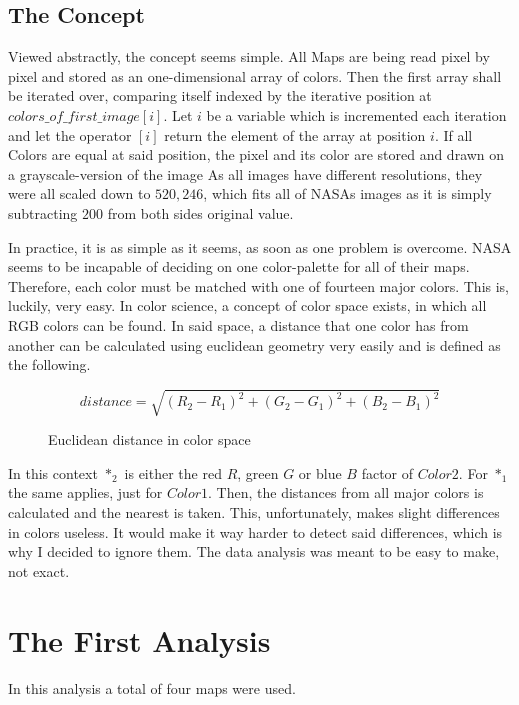 \documentclass{article}
\begin{document}
\begin{multicols}{3}
\section{The Concept}

Viewed abstractly, the concept seems simple.
All Maps are being read pixel by pixel and stored as an one-dimensional array of colors.
Then the first array shall be iterated over, comparing itself indexed by the iterative position at \(colors\_of\_first\_image[i]\).
Let \(i\) be a variable which is incremented each iteration and let the operator \([i]\) return the element of the array at position \(i\).
If all Colors are equal at said position, the pixel and its color are stored and drawn on a grayscale-version of the image
As all images have different resolutions, they were all scaled down to \(520,246\), which fits all of NASAs images as it is simply subtracting \(200\) from both sides original value.

In practice, it is as simple as it seems, as soon as one problem is overcome.
NASA seems to be incapable of deciding on one color-palette for all of their maps.
Therefore, each color must be matched with one of fourteen major colors.
This is, luckily, very easy.
In color science, a concept of color space exists, in which all RGB colors can be found.
In said space, a distance that one color has from another can be calculated using euclidean geometry very easily and is defined as the following.

\end{multicols}
    \begin{figure}[H]
        \[distance = \sqrt{(R_2 - R_1)^2 + (G_2 - G_1)^2 + (B_2 - B_1)^2}\]
        \caption{Euclidean distance in color space}
    \end{figure}
\begin{multicols}{3}
In this context \(*_2\) is either the red \(R\), green \(G\) or blue \(B\) factor of \(Color 2\).
For \(*_1\) the same applies, just for \(Color 1\). 
Then, the distances from all major colors is calculated and the nearest is taken.
This, unfortunately, makes slight differences in colors useless.
It would make it way harder to detect said differences, which is why I decided to ignore them. The data analysis was meant to be easy to make, not exact.


\section{The First Analysis}
In this analysis a total of four maps were used.

\end{multicols}
\end{document}
